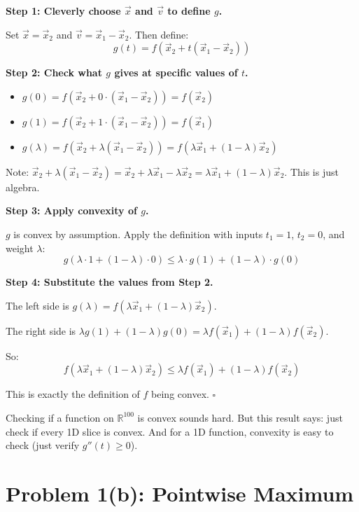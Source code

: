\documentclass[10pt]{article}
\theoremstyle{definition}
\theoremstyle{plain}
\newcommand{\RR}{\mathbb{R}}
\begin{document}
\textbf{Step 1: Cleverly choose $\vec{x}$ and $\vec{v}$ to define $g$.}

Set $\vec{x} = \vec{x}_2$ and $\vec{v} = \vec{x}_1 - \vec{x}_2$. Then define:
\[
    g(t) = f(\vec{x}_2 + t(\vec{x}_1 - \vec{x}_2))
\]

\textbf{Step 2: Check what $g$ gives at specific values of $t$.}
\begin{itemize}
    \item $g(0) = f(\vec{x}_2 + 0 \cdot (\vec{x}_1 - \vec{x}_2)) = f(\vec{x}_2)$
    \item $g(1) = f(\vec{x}_2 + 1 \cdot (\vec{x}_1 - \vec{x}_2)) = f(\vec{x}_1)$
    \item $g(\lambda) = f(\vec{x}_2 + \lambda(\vec{x}_1 - \vec{x}_2)) = f(\lambda \vec{x}_1 + (1-\lambda)\vec{x}_2)$
\end{itemize}

Note: $\vec{x}_2 + \lambda(\vec{x}_1 - \vec{x}_2) = \vec{x}_2 + \lambda \vec{x}_1 - \lambda \vec{x}_2 = \lambda \vec{x}_1 + (1-\lambda)\vec{x}_2$. This is just algebra.

\textbf{Step 3: Apply convexity of $g$.}

$g$ is convex by assumption. Apply the definition with inputs $t_1 = 1$, $t_2 = 0$, and weight $\lambda$:
\[
    g(\lambda \cdot 1 + (1-\lambda) \cdot 0) \le \lambda \cdot g(1) + (1-\lambda) \cdot g(0)
\]

\textbf{Step 4: Substitute the values from Step 2.}

The left side is $g(\lambda) = f(\lambda \vec{x}_1 + (1-\lambda)\vec{x}_2)$.

The right side is $\lambda g(1) + (1-\lambda)g(0) = \lambda f(\vec{x}_1) + (1-\lambda)f(\vec{x}_2)$.

So:
\[
    f(\lambda \vec{x}_1 + (1-\lambda)\vec{x}_2) \le \lambda f(\vec{x}_1) + (1-\lambda)f(\vec{x}_2)
\]

This is exactly the definition of $f$ being convex. $\square$

\begin{tcolorbox}[colframe=black!50, title={\small Intuition: Why this result is useful}]
Checking if a function on $\RR^{100}$ is convex sounds hard. But this result says: just check if every 1D slice is convex. And for a 1D function, convexity is easy to check (just verify $g''(t) \ge 0$).
\end{tcolorbox}

\section{Problem 1(b): Pointwise Maximum}
\end{document}

